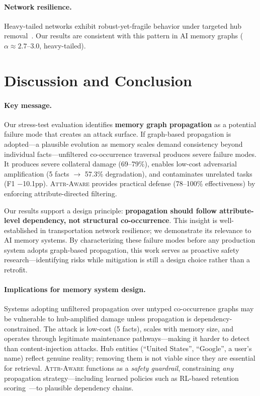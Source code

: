 \documentclass{article}
\newcommand{\attraware}{\textsc{Attr-Aware}}
\begin{document}
\paragraph{Network resilience.}
Heavy-tailed networks exhibit robust-yet-fragile behavior under targeted hub removal~\citep{albert_attack_2000, cohen_percolation_2000}.
Our results are consistent with this pattern in AI memory graphs ($\alpha \approx 2.7$--$3.0$, heavy-tailed).


\section{Discussion and Conclusion}
\label{sec:conclusion}

\paragraph{Key message.}
Our stress-test evaluation identifies \textbf{memory graph propagation} as a potential failure mode that creates an attack surface.
If graph-based propagation is adopted---a plausible evolution as memory scales demand consistency beyond individual facts---unfiltered co-occurrence traversal produces severe failure modes.
It produces severe collateral damage (69--79\%), enables low-cost adversarial amplification (5 facts $\rightarrow$ 57.3\% degradation), and contaminates unrelated tasks (F1 $-$10.1pp).
\attraware{} provides practical defense (78--100\% effectiveness) by enforcing attribute-directed filtering.

Our results support a design principle: \textbf{propagation should follow attribute-level dependency, not structural co-occurrence}.
This insight is well-established in transportation network resilience; we demonstrate its relevance to AI memory systems.
By characterizing these failure modes before any production system adopts graph-based propagation, this work serves as proactive safety research---identifying risks while mitigation is still a design choice rather than a retrofit.

\paragraph{Implications for memory system design.}
Systems adopting unfiltered propagation over untyped co-occurrence graphs may be vulnerable to hub-amplified damage unless propagation is dependency-constrained.
The attack is low-cost (5 facts), scales with memory size, and operates through legitimate maintenance pathways---making it harder to detect than content-injection attacks.
Hub entities (``United States'', ``Google'', a user's name) reflect genuine reality; removing them is not viable since they are essential for retrieval.
\attraware{} functions as a \textit{safety guardrail}, constraining \textit{any} propagation strategy---including learned policies such as RL-based retention scoring~\citep{mars_2025}---to plausible dependency chains.
\end{document}
